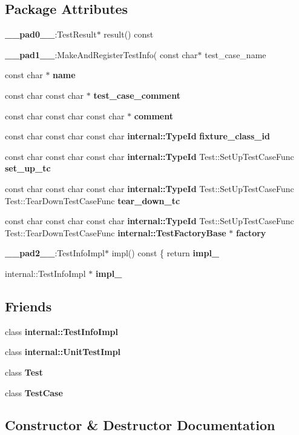 \subsection*{Package Attributes}
\begin{CompactItemize}
\item 
{\bf \_\-\_\-pad0\_\-\_\-}:TestResult$\ast$ result() const
\item 
{\bf \_\-\_\-pad1\_\-\_\-}:MakeAndRegisterTestInfo( const char$\ast$ test\_\-case\_\-name
\item 
const char $\ast$ {\bf name}
\item 
const char const char $\ast$ {\bf test\_\-case\_\-comment}
\item 
const char const char const char $\ast$ {\bf comment}
\item 
const char const char const char {\bf internal::TypeId} {\bf fixture\_\-class\_\-id}
\item 
const char const char const char {\bf internal::TypeId} Test::SetUpTestCaseFunc {\bf set\_\-up\_\-tc}
\item 
const char const char const char {\bf internal::TypeId} Test::SetUpTestCaseFunc Test::TearDownTestCaseFunc {\bf tear\_\-down\_\-tc}
\item 
const char const char const char {\bf internal::TypeId} Test::SetUpTestCaseFunc Test::TearDownTestCaseFunc {\bf internal::TestFactoryBase} $\ast$ {\bf factory}
\item 
{\bf \_\-\_\-pad2\_\-\_\-}:TestInfoImpl$\ast$ impl() const \{ return {\bf impl\_\-}
\item 
internal::TestInfoImpl $\ast$ {\bf impl\_\-}
\end{CompactItemize}
\subsection*{Friends}
\begin{CompactItemize}
\item 
class {\bf internal::TestInfoImpl}
\item 
class {\bf internal::UnitTestImpl}
\item 
class {\bf Test}
\item 
class {\bf TestCase}
\end{CompactItemize}


\subsection{Constructor \& Destructor Documentation}
